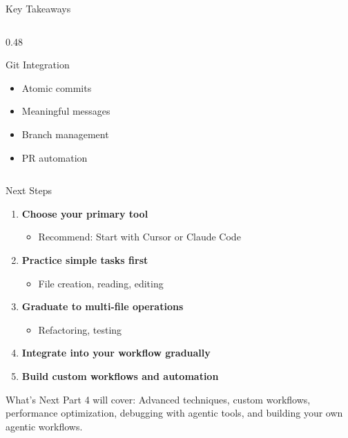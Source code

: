 \documentclass[aspectratio=169,11pt]{beamer}
\begin{document}
\begin{frame}{Key Takeaways}
\begin{columns}[T]
\begin{column}{0.48\textwidth}
            \begin{block}{Git Integration}
                \begin{itemize}
                    \item Atomic commits
                    \item Meaningful messages
                    \item Branch management
                    \item PR automation
                \end{itemize}
            \end{block}
        \end{column}
    \end{columns}
\end{frame}

\begin{frame}{Next Steps}
    \begin{enumerate}
        \item \textbf{Choose your primary tool}
              \begin{itemize}
                  \item Recommend: Start with Cursor or Claude Code
              \end{itemize}
        \item \textbf{Practice simple tasks first}
              \begin{itemize}
                  \item File creation, reading, editing
              \end{itemize}
        \item \textbf{Graduate to multi-file operations}
              \begin{itemize}
                  \item Refactoring, testing
              \end{itemize}
        \item \textbf{Integrate into your workflow gradually}
        \item \textbf{Build custom workflows and automation}
    \end{enumerate}

    \vspace{0.5cm}
    \begin{exampleblock}{What's Next}
        Part 4 will cover: Advanced techniques, custom workflows, performance optimization, debugging with agentic tools, and building your own agentic workflows.
    \end{exampleblock}
\end{frame}
\end{document}
